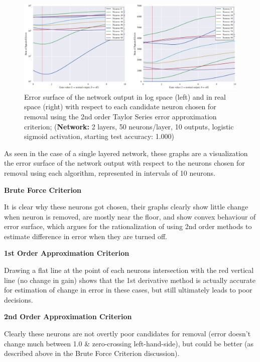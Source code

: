 \begin{figure}[!hb]
\centering
\includegraphics[width=\linewidth]{png/mnist-deep-g2-gain.pdf}
\caption{Error surface of the network output in log space (left) and in real space (right) with respect to each candidate neuron chosen for removal using the 2nd order Taylor Series error approximation criterion; (\textbf{Network:} 2 layers, 50 neurons/layer, 10 outputs, logistic sigmoid activation, starting test accuracy: 1.000)}
\label{fig:mnist-g2-double-layer}
\end{figure}


As seen in the case of a single layered network, these graphs are a visualization the error surface of the network output with respect to the neurons chosen for removal using each algorithm, represented in intervals of 10 neurons. 

\textbf{Brute Force Criterion}

It is clear why these neurons got chosen, their graphs clearly show little change when neuron is removed, are mostly near the floor, and show convex behaviour of error surface, which argues for the rationalization of using 2nd order methods to estimate difference in error when they are turned off.

\textbf{1st Order Approximation Criterion}

Drawing a flat line at the point of each neurons intersection with the red vertical line (no change in gain) shows that the 1st derivative method is actually accurate for estimation of change in error in these cases, but still ultimately leads to poor decisions. 

\textbf{2nd Order Approximation Criterion}

Clearly these neurons are not overtly poor candidates for removal (error doesn't change much between 1.0 \& zero-crossing left-hand-side), but could be better (as described above in the Brute Force Criterion discussion).



